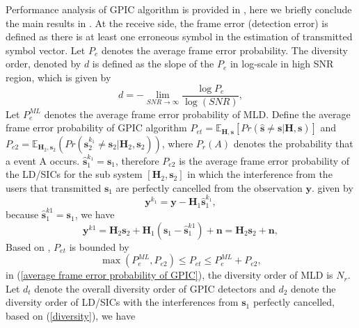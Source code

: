 \documentclass[12pt, draftclsnofoot, onecolumn]{IEEEtran}
\begin{document}
Performance analysis of GPIC algorithm is provided in \cite{radji2009interference}, here we briefly conclude the main results in \cite{radji2009interference}. At the receive side, the frame error (detection error) is defined as there is at least one erroneous symbol in the estimation of transmitted symbol vector. Let $P_{e}$ denotes the average frame error probability. The diversity order, denoted by $d$ is defined as the slope of the $P_{e}$ in log-scale in high SNR region, which is given by\cite{zheng2003diversity}
\begin{equation}
d=-\lim_{SNR\to\infty}\frac{\log{P_{e}}}{\log(SNR)},
\label{diversity}
\end{equation}
Let $P_{e}^{ML}$ denotes the average frame error probability of MLD. Define the average frame error probability of GPIC algorithm $P_{et}=\mathbb{E}_{\mathbf{H}, \mathbf{s}}[Pr(\hat{\mathbf{s}}\neq \mathbf{s}|\mathbf{H}, \mathbf{s})]$ and $P_{e2}=\mathbb{E}_{\mathbf{H}_{2}, \mathbf{s}_{2}}(Pr(\hat{\mathbf{s}}^{k_{1}}_{2}\neq \mathbf{s}_{2}|\mathbf{H}_{2}, \mathbf{s}_{2}))$, where $P_{r}(A)$ denotes the probability that a event A occurs. $\hat{\mathbf{s}}_{1}^{k_{1}}=\mathbf{s}_{1}$, therefore $P_{e2}$ is the average frame error probability of the LD/SICs for the sub system $[\mathbf{H}_{2}, \mathbf{s}_{2}]$ in which the interference from the users that transmitted $\mathbf{s}_{1}$ are perfectly cancelled from the observation $\mathbf{y}$. given by
\begin{equation}
\mathbf{y}^{k_{1}}=\mathbf{y}-\mathbf{H}_{1}\hat{\mathbf{s}}_{1}^{k_{1}},
\label{perfect IC}
\end{equation} 
because $\hat{\mathbf{s}}^{k1}_{1}=\mathbf{s}_{1}$, we have
\begin{equation}
\mathbf{y}^{k1}=\mathbf{H}_{2}\mathbf{s}_{2}+\mathbf{H}_{1}(\mathbf{s}_{1}-\hat{\mathbf{s}}_{1}^{k1})+\mathbf{n}=\mathbf{H}_{2}\mathbf{s}_{2}+\mathbf{n},
\label{sub MIMO system}
\end{equation} 
Based on \cite{radji2009interference}, $P_{et}$ is bounded by 
\begin{equation}
\max(P^{ML}_{e}, P_{e2})\leq P_{et}\leq P^{ML}_{e}+P_{e2}, 
\label{average frame error probability of GPIC}
\end{equation}
in (\ref{average frame error probability of GPIC}), the diversity order of MLD is $N_{r}$. Let $d_{t}$ denote the overall diversity order of GPIC detectors and $d_{2}$ denote the diversity order of LD/SICs with the interferences from $\mathbf{s}_{1}$ perfectly cancelled, based on (\ref{diversity}), we have 
\end{document}
